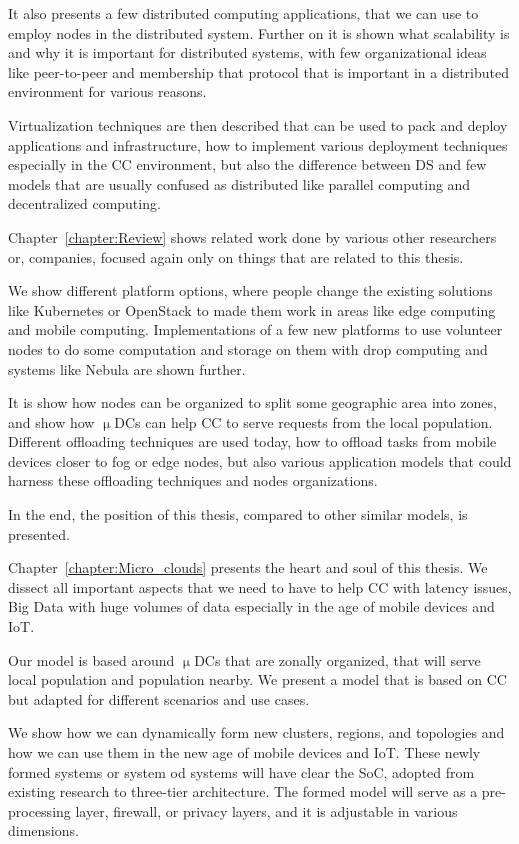 It also presents a few distributed computing applications, that we can use to employ nodes in the distributed system. Further on it is shown what scalability is and why it is important for distributed systems, with few organizational ideas like peer-to-peer and membership that protocol that is important in a distributed environment for various reasons.

Virtualization techniques are then described that can be used to pack and deploy applications and infrastructure, how to implement various deployment techniques especially in the CC environment, but also the difference between DS and few models that are usually confused as distributed like parallel computing and decentralized computing.

Chapter~\ref{chapter:Review} shows related work done by various other researchers or, companies, focused again only on things that are related to this thesis.

We show different platform options, where people change the existing solutions like Kubernetes or OpenStack to made them work in areas like edge computing and mobile computing. Implementations of a few new platforms to use volunteer nodes to do some computation and storage on them with drop computing and systems like Nebula are shown further.

It is show how nodes can be organized to split some geographic area into zones, and show how $\upmu$DCs can help CC to serve requests from the local population. Different offloading techniques are used today, how to offload tasks from mobile devices closer to fog or edge nodes, but also various application models that could harness these offloading techniques and nodes organizations.

In the end, the position of this thesis, compared to other similar models, is presented.

Chapter~\ref{chapter:Micro_clouds} presents the heart and soul of this thesis. We dissect all important aspects that we need to have to help CC with latency issues, Big Data with huge volumes of data especially in the age of mobile devices and IoT.

Our model is based around $\upmu$DCs that are zonally organized, that will serve local population and population nearby. We present a model that is based on CC but adapted for different scenarios and use cases.

We show how we can dynamically form new clusters, regions, and topologies and how we can use them in the new age of mobile devices and IoT. These newly formed systems or system od systems will have clear the SoC, adopted from existing research to three-tier architecture. The formed model will serve as a pre-processing layer, firewall, or privacy layers, and it is adjustable in various dimensions.

